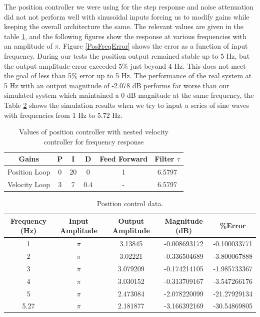 \documentclass[letterpaper]{article}
\begin{document}
The position controller we were using for the step response and noise attenuation did not not perform well with sinusoidal inputs forcing us to modify gains while keeping the overall architecture the same. The relevant values are given in the table \ref{positionFreqGains}, and the following figures show the response at various frequencies with an amplitude of $\pi$. Figure \ref{PosFreqError} shows the error as a function of input frequency. During our tests the position output remained stable up to 5 Hz, but the output amplitude error exceeded 5\% just beyond 4 Hz. This does not meet the goal of less than 5\% error up to 5 Hz.  The performance of the real system at 5 Hz with an output magnitude of -2.078 dB performs far worse than our simulated system which maintained a 0 dB magnitude at the same frequency, the Table \ref{q4_atable} shows the simulation results when we try to input a series of sine waves with frequencies from 1 Hz to 5.72 Hz. \\

\begin{table}[H]
\begin{center}
    \begin{tabular}{|c|c|c|c|c|c|}
        \hline
        Gains & P   & I & D   & Feed Forward   & Filter $\tau$   \\ \hline
        Position Loop            & 0 & 20  & 0 & 1 & 6.5797    \\ 
        Velocity Loop       & 3   & 7    & 0.4   & -  & 6.5797  \\ 
       \hline
    \end{tabular}
\end{center}
\caption{Values of position controller with nested velocity controller for frequency response}
\label{positionFreqGains}
\end{table}

\begin{table}[H]
    \begin{tabular}{|c|c|c|c|c|}
        \hline
        Frequency (Hz) & Input Amplitude & Output Amplitude & Magnitude (dB) & \%Error       \\ \hline
        1              & $\pi$           & 3.13845          & -0.008693172   & -0.100033771 \\ 
        2              & $\pi$           & 3.02221          & -0.336504689   & -3.800067888 \\ 
        3              & $\pi$           & 3.079209         & -0.174214105   & -1.985733367 \\ 
        4              & $\pi$           & 3.030152         & -0.313709167   & -3.547266176 \\ 
        5              & $\pi$           & 2.473084         & -2.078220099   & -21.27929134 \\ 
        5.27           & $\pi$           & 2.181877         & -3.166392169   & -30.54869805 \\
        \hline
    \end{tabular}
    \caption{Position control data.}
    \label{q4_atable}
\end{table}
\end{document}
